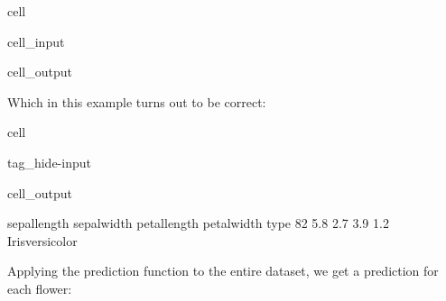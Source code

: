 \documentclass[letterpaper,10pt,english]{jupyterBook}
\begin{document}
\begin{sphinxuseclass}{cell}\begin{sphinxVerbatimInput}

\begin{sphinxuseclass}{cell_input}
\begin{sphinxVerbatim}[commandchars=\\\{\}]
\PYG{p}{[}\PYG{p}{[}\PYG{p}{]}\PYG{p}{]}
\end{sphinxVerbatim}

\end{sphinxuseclass}\end{sphinxVerbatimInput}
\begin{sphinxVerbatimOutput}

\begin{sphinxuseclass}{cell_output}
\begin{sphinxVerbatim}
\end{sphinxVerbatim}

\end{sphinxuseclass}\end{sphinxVerbatimOutput}

\end{sphinxuseclass}
\sphinxAtStartPar
Which in this example turns out to be correct:

\begin{sphinxuseclass}{cell}
\begin{sphinxuseclass}{tag_hide-input}\begin{sphinxVerbatimOutput}

\begin{sphinxuseclass}{cell_output}
\begin{sphinxVerbatim}[commandchars=\\\{\}]
    sepal\PYGZhy{}length  sepal\PYGZhy{}width  petal\PYGZhy{}length  petal\PYGZhy{}width             type
82           5.8          2.7           3.9          1.2  Iris\PYGZhy{}versicolor
\end{sphinxVerbatim}

\end{sphinxuseclass}\end{sphinxVerbatimOutput}

\end{sphinxuseclass}
\end{sphinxuseclass}
\sphinxAtStartPar
Applying the prediction function to the entire dataset, we get a prediction for each flower:
\end{document}
